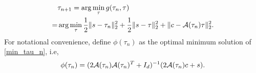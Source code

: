 \documentclass{article}
\newtheorem{theorem}{Theorem}[section]
\theoremstyle{remark}
\begin{document}
\begin{equation}\label{min_tau_n}
\begin{aligned}
&\tau_{n+1} = \arg\min_{\tau} g(\tau_{n},\tau)  \\
=&\arg\min_{\tau}\frac{1}{2}\|s-\tau_{n}\|_2^2+\frac{1}{2}\|s-\tau\|_2^2+\|c-{\cal A}(\tau_{n})\tau\|_2^2.
\end{aligned}
\end{equation}
For notational convenience, define $\phi(\tau_{n})$ as the optimal minimum solution of \eqref{min_tau_n}, i.e,
\[
\phi(\tau_{n})=( 2{\cal A}(\tau_{n}){\cal A}(\tau_{n})^T+ I_d)^{-1} (2{\cal A}(\tau_{n})c+ s).
\]
\end{document}
